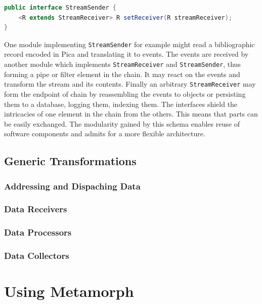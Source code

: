\documentclass[12pt,a4paper]{article}
\begin{document}
\begin{lstlisting}[float=htb, label=streamsender,caption={The interface of an event stream sender. By virtue of the template R we can efficiently define processing chains via method chaining. See listing \ref{codepipeline2} for examples.}, language=Java]
public interface StreamSender {
	<R extends StreamReceiver> R setReceiver(R streamReceiver);
}
\end{lstlisting}

One module implementing {\tt StreamSender} for example might read a bibliographic record encoded in Pica and translating it to events. 
The events are received by another module which implements {\tt StreamReceiver} and {\tt StreamSender}, thus forming a pipe or filter element in the chain. 
It may react on the events and transform the stream and its contents. Finally an arbitrary {\tt StreamReceiver} may form the endpoint of chain by reassembling the events to objects or persisting them to a database, logging them, indexing them. The interfaces shield the intricacies of one element in the chain from the others. This means that parts can be easily exchanged. The modularity gained by this schema enables reuse of software components and admits for a more flexible architecture.


\subsection{Generic Transformations}\label{trans}


\subsubsection{Addressing and Dispaching Data}\label{dispatching}

\subsubsection{Data Receivers}

\subsubsection{Data Processors}

\subsubsection{Data Collectors}



\section{Using Metamorph}
\end{document}
